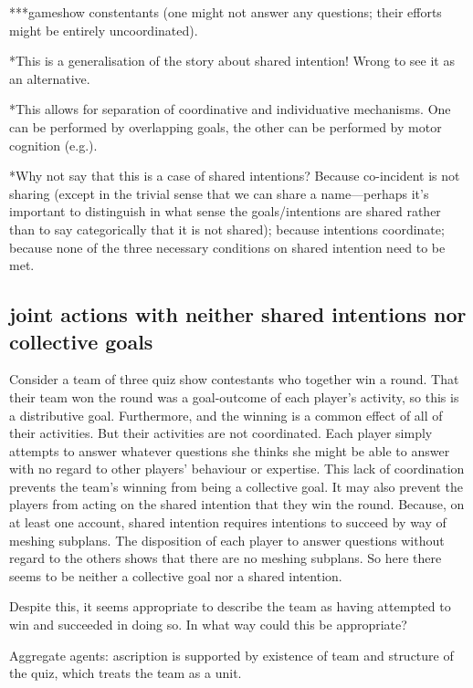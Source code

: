 \documentclass[12pt,a4paper]{extarticle}
\begin{document}
***gameshow constentants (one might not answer any questions; their efforts might be entirely uncoordinated).

*This is a generalisation of the story about shared intention!  Wrong to see it as an alternative.





*This allows for separation of coordinative and individuative mechanisms.  One can be performed by overlapping goals, the other can be performed by motor cognition (e.g.).

*Why not say that this is a case of shared intentions?  Because co-incident is not sharing (except in the trivial sense that we can share a name---perhaps it's important to distinguish in what sense the goals/intentions are shared rather than to say categorically that it is not shared); because intentions coordinate; because none of the three necessary conditions on shared intention need to be met.




\subsection{joint actions with neither shared intentions nor collective goals}
Consider a team of three quiz show contestants who together win a round.
That their team won the round was a goal-outcome of each player's activity, so this is a distributive goal.  
Furthermore,  and the winning is a common effect of all of their activities.
But their activities are not coordinated.  Each player simply attempts to answer whatever questions she thinks she might be able to answer with no regard to other players' behaviour or expertise.
This lack of coordination prevents the team's winning from being a collective goal.
It may also prevent the players from acting on the shared intention that they win the round.  Because, on at least one account, shared intention requires intentions to succeed by way of meshing subplans.  The disposition of each player to answer questions without regard to the others shows that there are no meshing subplans.
So here there seems to be neither a collective goal nor a shared intention.

Despite this, it seems appropriate to describe the team as having attempted to win and succeeded in doing so.  In what way could this be appropriate?

Aggregate agents: ascription is supported by existence of team and structure of the quiz, which treats the team as a unit.
\end{document}
